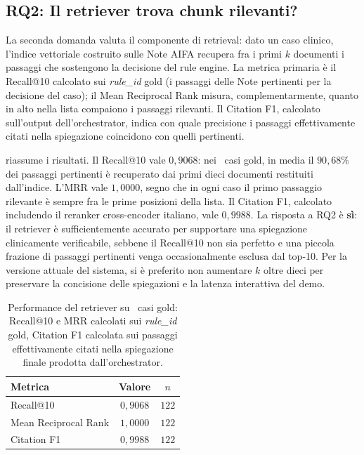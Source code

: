\subsection{RQ2: Il retriever trova chunk rilevanti?}
\label{sec:rq2}

La seconda domanda valuta il componente di retrieval: dato un caso clinico, l'indice vettoriale costruito sulle Note AIFA recupera fra i primi $k$ documenti i passaggi che sostengono la decisione del rule engine. La metrica primaria è il Recall@10 calcolato sui \emph{rule\_id} gold (i passaggi delle Note pertinenti per la decisione del caso); il Mean Reciprocal Rank misura, complementarmente, quanto in alto nella lista compaiono i passaggi rilevanti. Il Citation F1, calcolato sull'output dell'orchestrator, indica con quale precisione i passaggi effettivamente citati nella spiegazione coincidono con quelli pertinenti.

 riassume i risultati. Il Recall@10 vale $0{,}9068$: nei \goldn\ casi gold, in media il $90{,}68\%$ dei passaggi pertinenti è recuperato dai primi dieci documenti restituiti dall'indice. L'MRR vale $1{,}0000$, segno che in ogni caso il primo passaggio rilevante è sempre fra le prime posizioni della lista. Il Citation F1, calcolato includendo il reranker cross-encoder italiano, vale $0{,}9988$. La risposta a RQ2 è \textbf{sì}: il retriever è sufficientemente accurato per supportare una spiegazione clinicamente verificabile, sebbene il Recall@10 non sia perfetto e una piccola frazione di passaggi pertinenti venga occasionalmente esclusa dal top-10. Per la versione attuale del sistema, si è preferito non aumentare $k$ oltre dieci per preservare la concisione delle spiegazioni e la latenza interattiva del demo.

\begin{table}[t]
  \centering
  \caption{Performance del retriever su \goldn\ casi gold: Recall@10 e MRR calcolati sui \emph{rule\_id} gold, Citation F1 calcolata sui passaggi effettivamente citati nella spiegazione finale prodotta dall'orchestrator.}
  \label{tab:retrieval}
  \small
  \begin{tabular}{lcc}
    \toprule
    Metrica & Valore & $n$ \\
    \midrule
    Recall@10           & $0{,}9068$ & $122$ \\
    Mean Reciprocal Rank& $1{,}0000$ & $122$ \\
    Citation F1         & $0{,}9988$ & $122$ \\
    \bottomrule
  \end{tabular}
\end{table}

